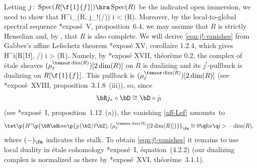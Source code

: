\bpf
Letting $j \colon \Spec(R[\f{1}{f}]) \hra \Spec(R)$ be the indicated open immersion, we need to show that
\be \label{eqn:j!-vanishes}
H^i_{\fm}(R, j_!(\bZ/\ell \bZ))  \q {} \q i < \dim(R).
\ee
Moreover, by the local-to-global spectral sequence \cite{SGA4II}*{expos\'{e}~V, proposition~6.4}, we may assume that $R$ is strictly Henselian and, by , that $R$ is also complete. We will derive \eqref{eqn:j!-vanishes} from Gabber's affine Lefschetz theorem \cite{ILO14}*{expos\'{e} XV, corollaire 1.2.4}, which gives
\be {}
\tst H^i(R[\f{1}{f}], \bZ/\ell\bZ)  \q {} \q i > \dim(R).
\ee
Namely, by %
\cite{ILO14}*{expos\'{e} XVII, th\'{e}or\`{e}me 0.2}, the complex of \'{e}tale sheaves $(\mu_\ell^{\tensor \dim(R)})[2\dim(R)]$  on $R$ is dualizing and its $j^!$-pullback is dualizing on $R[\f{1}{f}]$. This pullback is $(\mu_\ell^{\tensor \dim(R)})[2\dim(R)]$ (see \cite{SGA4III}*{expos\'{e}~XVIII, proposition~3.1.8~(iii)}), so, since
\[
\bR j_* \circ \bD \cong \bD \circ j_!
\]
(see \cite{SGA5}*{expos\'{e}~I, proposition~1.12~(a)}), the vanishing \eqref{aff-Lef} amounts~to
\[
\tst \p{H^{i}\p{\bR\sH om\p{j_!(\bZ/\ell \bZ), (\mu_\ell^{\tensor \dim(R)})[2\dim(R)]}}}_{\fm} \cong 0 \q \text{for} \q i > -\dim(R),
\]
where $(-)_{\fm}$ indicates the stalk. To obtain \eqref{eqn:j!-vanishes} it remains to use local duality in \'{e}tale cohomology \cite{SGA5}*{expos\'{e}~I, \'{e}quation~(4.2.2)} (our dualizing complex is normalized %
as there by \cite{ILO14}*{expos\'{e}~XVI, th\'{e}or\`{e}me~3.1.1}). %
\epf

















